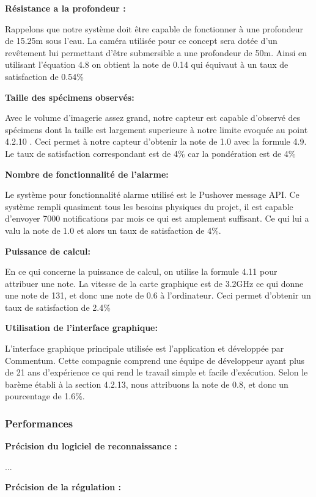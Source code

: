 \textbf{Résistance a la profondeur :}

Rappelons que notre système doit être capable de fonctionner à une profondeur de 15.25m sous l’eau. La caméra utilisée pour ce concept sera dotée d’un revêtement lui permettant d’être submersible a une profondeur de 50m. Ainsi en utilisant l’équation 4.8 on obtient la note de 0.14 qui équivaut à un taux de satisfaction de 0.54\%

\textbf{Taille des spécimens observés:}

Avec le volume d’imagerie assez grand, notre capteur est capable d’observé des spécimens dont la taille est largement superieure à notre limite evoquée au point 4.2.10 . Ceci permet à notre capteur d’obtenir la note de 1.0 avec la formule 4.9. Le taux de satisfaction correspondant est de 4\% car la pondération est de 4\%

\textbf{Nombre de fonctionnalité de l’alarme:}

Le système pour fonctionnalité alarme utilisé est le Pushover message API. Ce système rempli quasiment tous les besoins physiques du projet, il est capable d’envoyer 7000 notifications par mois ce qui est amplement suffisant. Ce qui lui a valu la note de 1.0 et alors un taux de satisfaction de 4\%.

\textbf{Puissance de calcul:}

En ce qui concerne la puissance de calcul, on utilise la formule 4.11 pour attribuer une note. La vitesse de la carte graphique est de 3.2GHz ce qui donne une note de 131, et donc une note de 0.6 à l’ordinateur. Ceci permet d’obtenir un taux de satisfaction de 2.4\%

\textbf{Utilisation de l’interface graphique:}

L’interface graphique principale utilisée est l’application et développée par Commentum. Cette compagnie comprend une équipe de développeur ayant plus de 21 ans d’expérience ce qui rend le travail simple et facile d’exécution. Selon le barème établi à la section 4.2.13, nous attribuons la note de 0.8, et donc un pourcentage de 1.6\%.

\subsubsection{Performances}

\textbf{Précision du logiciel de reconnaissance : }

...

\textbf{Précision de la régulation : }

